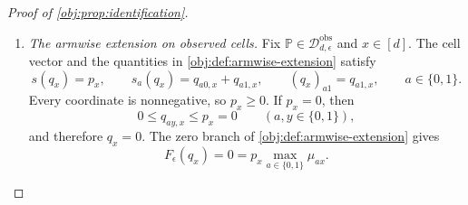 \begin{proof}[Proof of \cref{obj:prop:identification}]
\begin{enumerate}
Suppose now that \(p_x>0\). The lower overlap bound in \cref{obj:ass:shrinking-overlap} gives
\[
q_{10,x}+q_{11,x}=p_x\pi_x\ge\epsilon p_x>0.
\]
The decomposition of the cell mass and the upper overlap bound give
\[
\begin{aligned}
p_x&=(q_{00,x}+q_{01,x})+(q_{10,x}+q_{11,x}),\\
q_{10,x}+q_{11,x}&\le(1-\epsilon)p_x,
\end{aligned}
\]
and hence
\[
q_{00,x}+q_{01,x}
=p_x-(q_{10,x}+q_{11,x})
\ge\epsilon p_x>0.
\]
Thus both arm masses are positive.

For either \(a\in\{0,1\}\), \cref{obj:ass:conditional-exchangeability} supplies
\[
P(X=x,A=a,Y(a)=1)\,p_x
=
P(X=x,A=a)\,P(X=x,Y(a)=1).
\]
Consistency, as specified in \cref{obj:ass:consistency}, identifies the selected atoms:
\[
P(X=x,A=a,Y(a)=y)=q_{ay,x},
\qquad y\in\{0,1\}.
\]
Summing this identity over \(y\), and substituting its outcome-one instance into the exchangeability identity, gives
\[
P(X=x,A=a)=q_{a0,x}+q_{a1,x},
\qquad
q_{a1,x}p_x
=(q_{a0,x}+q_{a1,x})P(X=x,Y(a)=1).
\]
Division by the positive cell and arm masses now yields
\[
\mathbb E_P[Y(a)\mid X=x]
=
\frac{P(X=x,Y(a)=1)}{p_x}
=
\frac{q_{a1,x}}{q_{a0,x}+q_{a1,x}}
=\mu_{ax}.
\]
Combining the positive- and zero-mass cases and summing over \(x\) proves
\[
\begin{aligned}
V^\star(P)
&=\sum_{x\in[d]}P(X=x)
\max_{a\in\{0,1\}}\mathbb E_P[Y(a)\mid X=x]\\
&=\sum_{x\in[d]}p_x\max_{a\in\{0,1\}}\mu_{ax}
=\Psi\{\operatorname{Obs}(P)\},
\end{aligned}
\]
where the last equality is the definition in \cref{obj:def:observed-value}.

\item \emph{The armwise extension on observed cells.}
Fix \(\mathbb P\in\mathcal D_{d,\epsilon}^{\mathrm{obs}}\) and \(x\in[d]\). The cell vector and the quantities in \cref{obj:def:armwise-extension} satisfy
\[
s(q_x)=p_x,\qquad
s_a(q_x)=q_{a0,x}+q_{a1,x},\qquad
(q_x)_{a1}=q_{a1,x},
\qquad a\in\{0,1\}.
\]
Every coordinate is nonnegative, so \(p_x\ge0\). If \(p_x=0\), then
\[
0\le q_{ay,x}\le p_x=0
\qquad(a,y\in\{0,1\}),
\]
and therefore \(q_x=0\). The zero branch of \cref{obj:def:armwise-extension} gives
\[
F_\epsilon(q_x)=0
=p_x\max_{a\in\{0,1\}}\mu_{ax}.
\]


\end{enumerate}
\end{proof}

